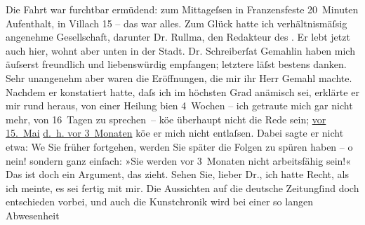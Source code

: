 \begin{ledgroupsized}[t]{13cm}
           \pstart
           Die Fahrt war furchtbar ermüdend: zum Mittageſsen in Franzensfeste 20 Minuten Aufenthalt, in Villach 15 – das war alles. Zum Glück hatte ich verhältnismäſsig angenehme
               Gesellschaft, darunter Dr. Rullma{\geminationn}, den Redakteur des \label{K_L00176-2v}\label{K_L00176-2h}. Er lebt jetzt
               auch hier, wohnt aber unten in der Stadt.\pend
           \pstart
           Dr. Schreiberſa{\geminationm}t Gemahlin haben mich äuſserst freundlich und
               liebenswürdig empfangen; letztere läſst bestens danken. Sehr unangenehm aber waren
               die Eröffnungen, die mir ihr Herr Gemahl machte. Nachdem er konstatiert hatte, daſs ich im höchsten Grad
               anämisch sei, erklärte er mir rund heraus, von einer Heilung bi{\geminationn}en 4 Wochen – ich getraute mich gar nicht mehr, von
               16 Tagen zu sprechen – kö{\geminationn}e überhaupt nicht die Rede
               sein; \uline{vor 15. Mai}{ }{\pb}\uline{d. h. vor 3 Monaten} kö{\geminationn}e
               er mich nicht entlaſsen. Dabei sagte er nicht etwa: We{\geminationn}
               Sie früher fortgehen, werden Sie später die Folgen zu spüren haben – o nein! sondern
               ganz einfach: »Sie werden vor 3 Monaten nicht arbeitsfähig sein!« Das ist doch ein
               Argument, das zieht.\pend
           \pstart
           Sehen Sie, lieber Dr., ich hatte Recht, als ich meinte, es sei fertig mit mir. Die
               Aussichten auf die deutsche Zeitungſind doch entschieden vorbei, und auch die Kunstchronik wird bei einer so langen Abwesenheit

\end{ledgroupsized}
